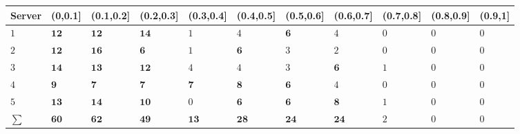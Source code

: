 
\begin{tabular}{l|l|l|l|l|l|l|l|l|l|l}
\hline
Server & (0,0.1] & (0.1,0.2] & (0.2,0.3] & (0.3,0.4] & (0.4,0.5] & (0.5,0.6] & (0.6,0.7] & (0.7,0.8] & (0.8,0.9] & (0.9,1]\\
\hline
$1$ & $\bm{12}$ & $\bm{12}$ & $\bm{14}$ & $1$ & $4$ & $\bm{6}$ & $4$ & $0$ & $0$ & $0$\\
\hline
$2$ & $\bm{12}$ & $\bm{16}$ & $\bm{6}$ & $1$ & $\bm{6}$ & $3$ & $2$ & $0$ & $0$ & $0$\\
\hline
$3$ & $\bm{14}$ & $\bm{13}$ & $\bm{12}$ & $4$ & $4$ & $3$ & $\bm{6}$ & $1$ & $0$ & $0$\\
\hline
$4$ & $\bm{9}$ & $\bm{7}$ & $\bm{7}$ & $\bm{7}$ & $\bm{8}$ & $\bm{6}$ & $4$ & $0$ & $0$ & $0$\\
\hline
$5$ & $\bm{13}$ & $\bm{14}$ & $\bm{10}$ & $0$ & $\bm{6}$ & $\bm{6}$ & $\bm{8}$ & $1$ & $0$ & $0$\\
\hline
$\sum$ & $\bm{60}$ & $\bm{62}$ & $\bm{49}$ & $\bm{13}$ & $\bm{28}$ & $\bm{24}$ & $\bm{24}$ & $2$ & $0$ & $0$\\
\hline
\end{tabular}
